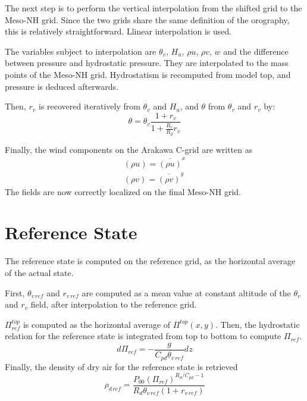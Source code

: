 The next step is to perform the vertical interpolation from the
shifted grid to the Meso-NH grid. Since the two grids share the same
definition of the orography, this is relatively straightforward.
Llinear interpolation is used.

The variables subject to interpolation are $\theta_v$, $H_u$, $\rho u$,
$\rho v$, $w$ and the difference between pressure and hydrostatic pressure.
They are interpolated to the mass points of the Meso-NH grid.
Hydrostatism is recomputed from model top, and pressure is deduced afterwards.

Then, $r_v$ is recovered iteratively from $\theta_v$ and $H_u$, and $\theta$
from $\theta_v$ and $r_v$ by:
\begin{equation}
\theta=\theta_v\frac{1+r_v}{1+\frac{R_v}{R_d}r_v}
\end{equation}

Finally, the wind components on the Arakawa C-grid are written as
\begin{eqnarray}
(\rho u)=\overline{(\rho u)}^x \\
(\rho v)=\overline{(\rho v)}^y
\end{eqnarray}
The fields are now correctly localized on the final Meso-NH grid.

\section{Reference State}

The reference state is computed on the reference grid, as the horizontal
average of the actual state.

First, $\theta_{v\,ref}$ and $r_{v\,ref}$ are computed as a mean value at
constant altitude of the $\theta_v$ and $r_v$ field, after interpolation
to the reference grid.

$\Pi_{ref}^{top}$ is computed as the horizontal average of $\Pi^{top}(x,y)$.
Then, the hydrostatic relation for the reference state
is integrated from top to bottom to compute $\Pi_{ref}$.
\begin{equation}
d\Pi_{ref}=-\frac{g}{C_{pd}\theta_{v\,ref}}dz
\end{equation}
Finally, the density of dry air for the reference state is retrieved
\begin{equation}
\rho_{d\,ref}=\frac{P_{00}(\Pi_{ref})^{R_d/C_{pd}-1}}
{R_d \theta_{v\,ref}(1+r_{v\,ref})}
\end{equation}

